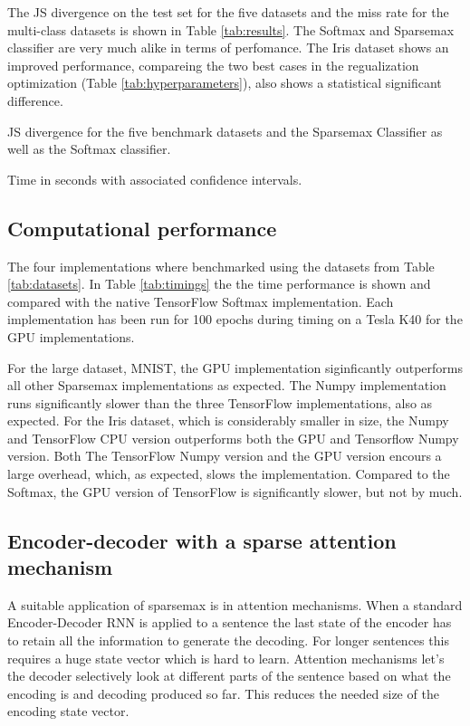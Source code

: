 The JS divergence on the test set for the five datasets and the miss rate for the multi-class datasets is shown in Table \ref{tab:results}. The Softmax and Sparsemax classifier are very much alike in terms of perfomance. The Iris dataset shows an improved performance, compareing the two best cases in the regualization optimization (Table \ref{tab:hyperparameters}), also shows a statistical significant difference.

\begin{table}[H]
\centering

\caption{JS divergence for the five benchmark datasets and the Sparsemax Classifier as well as the Softmax classifier.}
\label{tab:results}
\end{table}

\begin{table}
\centering

\caption{Time in seconds with associated confidence intervals.}
\label{tab:timings}
\end{table}

\subsection{Computational performance}
The four implementations where benchmarked using the datasets from Table \ref{tab:datasets}. In Table \ref{tab:timings} the the time performance is shown and compared with the native TensorFlow Softmax implementation. Each implementation has been run for 100 epochs during timing on a Tesla K40 for the GPU implementations.

For the large dataset, MNIST, the GPU implementation siginficantly outperforms all other Sparsemax implementations as expected. The Numpy implementation runs significantly slower than the three TensorFlow implementations, also as expected. For the Iris dataset, which is considerably smaller in size, the Numpy and TensorFlow CPU version outperforms both the GPU and Tensorflow Numpy version. Both The TensorFlow Numpy version and the GPU version encours a large overhead, which, as expected, slows the implementation. Compared to the Softmax, the GPU version of TensorFlow is significantly slower, but not by much.

\subsection{Encoder-decoder with a sparse attention mechanism}
A suitable application of sparsemax is in attention mechanisms. When a standard Encoder-Decoder RNN is applied to a sentence the last state of the encoder has to retain all the information to generate the decoding. For longer sentences this requires a huge state vector which is hard to learn. Attention mechanisms let's the decoder selectively look at different parts of the sentence based on what the encoding is and decoding produced so far. This reduces the needed size of the encoding state vector. 

